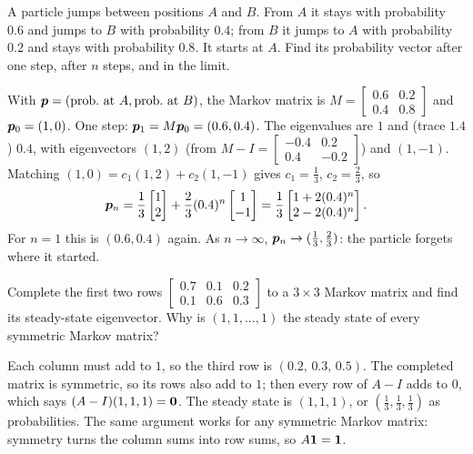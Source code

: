 \begin{exercise}\label{exr:u26-particle}
A particle jumps between positions $A$ and $B$. From $A$ it stays with probability $0.6$ and
jumps to $B$ with probability $0.4$; from $B$ it jumps to $A$ with probability $0.2$ and
stays with probability $0.8$. It starts at $A$. Find its probability vector after one step,
after $n$ steps, and in the limit.
\end{exercise}
\begin{solution}
With $\boldsymbol{p}=(\text{prob.\ at }A,\text{prob.\ at }B)$, the Markov matrix is
$M=\left[\begin{smallmatrix} 0.6&0.2\\ 0.4&0.8\end{smallmatrix}\right]$ and
$\boldsymbol{p}_0=(1,0)$. One step: $\boldsymbol{p}_1=M\boldsymbol{p}_0=(0.6,0.4)$. The eigenvalues are $1$ and
(trace $1.4$) $0.4$, with eigenvectors $(1,2)$ (from
$M-I=\left[\begin{smallmatrix} -0.4&0.2\\ 0.4&-0.2\end{smallmatrix}\right]$) and $(1,-1)$.
Matching $(1,0)=c_1(1,2)+c_2(1,-1)$ gives $c_1=\tfrac13$, $c_2=\tfrac23$, so
\[
  \boldsymbol{p}_n=\frac13\begin{bmatrix} 1\\ 2\end{bmatrix}+\frac23(0.4)^{n}\begin{bmatrix} 1\\ -1\end{bmatrix}
  =\frac13\begin{bmatrix} 1+2(0.4)^{n}\\ 2-2(0.4)^{n}\end{bmatrix}.
\]
For $n=1$ this is $(0.6,0.4)$ again. As $n\to\infty$, $\boldsymbol{p}_n\to(\tfrac13,\tfrac23)$: the
particle forgets where it started.
\end{solution}

\begin{exercise}\label{exr:u26-complete}
Complete the first two rows
$\left[\begin{smallmatrix} 0.7&0.1&0.2\\ 0.1&0.6&0.3\end{smallmatrix}\right]$ to a $3\times3$
Markov matrix and find its steady-state eigenvector. Why is $(1,1,\dots,1)$ the steady state of
every symmetric Markov matrix?
\end{exercise}
\begin{solution}
Each column must add to $1$, so the third row is $(0.2,\,0.3,\,0.5)$. The completed matrix is
symmetric, so its rows also add to $1$; then every row of $A-I$ adds to $0$, which says
$(A-I)(1,1,1)=\boldsymbol{0}$. The steady state is $(1,1,1)$, or $(\tfrac13,\tfrac13,\tfrac13)$ as
probabilities. The same argument works for any symmetric Markov matrix: symmetry turns the
column sums into row sums, so $A\boldsymbol{1}=\boldsymbol{1}$.
\end{solution}

